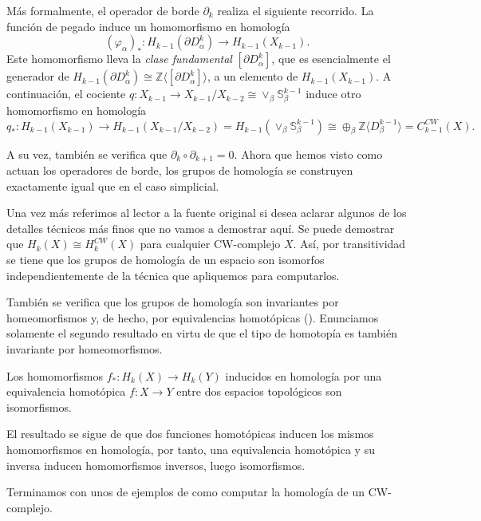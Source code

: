 Más formalmente, el operador de borde $\partial_k$ realiza el siguiente recorrido. La función de pegado induce un homomorfismo en homología 
\[
(\varphi_{\alpha})_* : H_{k-1}(\partial D_{\alpha}^k)\to H_{k-1}(X_{k-1}).
\]
Este homomorfismo lleva la \textit{clase fundamental} $[\partial D_{\alpha}^k]$, que es esencialmente el generador de $H_{k-1}(\partial D_{\alpha}^k)\cong \mathbb{Z}\langle [\partial D_{\alpha}^k]\rangle$, a un elemento de $H_{k-1}(X_{k-1})$. A continuación, el cociente $q: X_{k-1}\to X_{k-1}/X_{k-2} \cong \vee_{\beta}\mathbb{S}_{\beta}^{k-1}$ induce otro homomorfismo en homología 
\[
q_*: H_{k-1}(X_{k-1}) \to H_{k-1}(X_{k-1}/X_{k-2}) = H_{k-1}(\vee_{\beta}\mathbb{S}_{\beta}^{k-1}) \cong \oplus_{\beta}\mathbb{Z}\langle D^{k-1}_{\beta} \rangle = C^{CW}_{k-1}(X).
\]

A su vez, también se verifica que $\partial_{k}\circ\partial_{k+1} = 0$. Ahora que hemos visto como actuan los operadores de borde, los grupos de homología se construyen exactamente igual que en el caso simplicial.

Una vez más referimos al lector a la fuente original \cite{munoz2021} si desea aclarar algunos de los detalles técnicos más finos que no vamos a demostrar aquí. Se puede demostrar que $H_k(X)\cong H^{CW}_k(X)$ para cualquier CW-complejo $X$. Así, por transitividad se tiene que los grupos de homología de un espacio son isomorfos independientemente de la técnica que apliquemos para computarlos.

También se verifica que los grupos de homología son invariantes por homeomorfismos y, de hecho, por equivalencias homotópicas (\cite[p.~111]{hatcher2002}). Enunciamos solamente el segundo resultado en virtu de que el tipo de homotopía es también invariante por homeomorfismos.

\begin{theorem}
    Los homomorfismos $f_*:H_k(X)\to H_k(Y)$ inducidos en homología por una equivalencia homotópica $f:X\to Y$ entre dos espacios topológicos son isomorfismos.
\end{theorem}

El resultado se sigue de que dos funciones homotópicas inducen los mismos homomorfismos en homología, por tanto, una equivalencia homotópica y su inversa inducen homomorfismos inversos, luego isomorfismos.

Terminamos con unos de ejemplos de como computar la homología de un CW-complejo.

